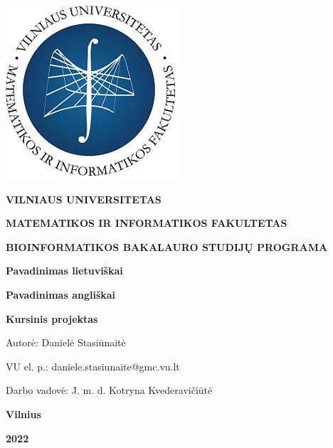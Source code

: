 \documentclass[12pt]{article}
\begin{document}

\begin{titlepage}
\vskip 20pt
\begin{center}
\includegraphics[scale=0.5]{MIF}
\end{center}


\vskip 20pt
\centerline{\bf \large \textbf{VILNIAUS UNIVERSITETAS}}
\bigskip
\centerline{\large \textbf{MATEMATIKOS IR INFORMATIKOS FAKULTETAS}}
\bigskip
\centerline{\large \textbf{BIOINFORMATIKOS BAKALAURO STUDIJŲ PROGRAMA}}

\vskip 90pt
\begin{center}
    {\bf \LARGE Pavadinimas lietuviškai}
\end{center}
\begin{center}
    {\bf \Large Pavadinimas angliškai}
\end{center}
\vskip 20pt
\centerline{\bf \large \textbf{Kursinis projektas}}
\bigskip
\vskip 40pt

\hskip 140pt {\large Autorė: Danielė Stasiūnaitė}

\hskip 140pt{\large VU el. p.: daniele.stasiunaite@gmc.vu.lt}
\bigskip
\vskip 20pt

\hskip 140pt {\large Darbo vadovė: J. m. d. Kotryna Kvederavičiūtė}
\vskip 60pt
\vskip 40pt
\centerline{\large \textbf{Vilnius}}
\centerline{\large \textbf{2022}}
\newpage
\end{titlepage}



\tableofcontents
\newpage

\end{document}
